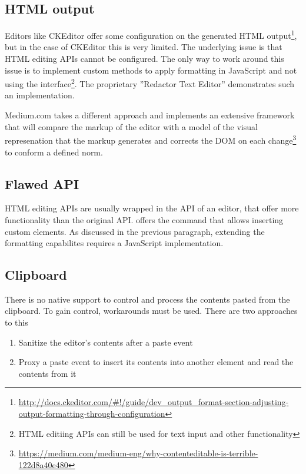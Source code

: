 \subsection{HTML output} 
\label{subsec:treating_issues_first}

Editors like CKEditor offer some configuration on the generated HTML output\footnote{\url{http://docs.ckeditor.com/\#!/guide/dev\_output\_format-section-adjusting-output-formatting-through-configuration}}, but in the case of CKEditor this is very limited. The underlying issue is that HTML editing APIs cannot be configured. The only way to work around this issue is to implement custom methods to apply formatting in JavaScript and not using the  interface\footnote{HTML editiing APIs can still be used for text input and other functionality}. The proprietary ''Redactor Text Editor'' demonstrates such an implementation.

Medium.com takes a different approach and implements an extensive framework that will compare the markup of the editor with a model of the visual represenation that the markup generates and corrects the DOM on each change\footnote{\url{https://medium.com/medium-eng/why-contenteditable-is-terrible-122d8a40e480}} to conform a defined norm.

\subsection{Flawed API}

HTML editing APIs are usually wrapped in the API of an editor, that offer more functionality than the original API.  offers the  command that allows inserting custom elements. As discussed in the previous paragraph, extending the formatting capabilites requires a JavaScript implementation.

\subsection{Clipboard}

There is no native support to control and process the contents pasted from the clipboard. To gain control, workarounds must be used. There are two approaches to this

\begin{enumerate}
\item Sanitize the editor's contents after a paste event
\item Proxy a paste event to insert its contents into another element and read the contents from it
\end{enumerate}

